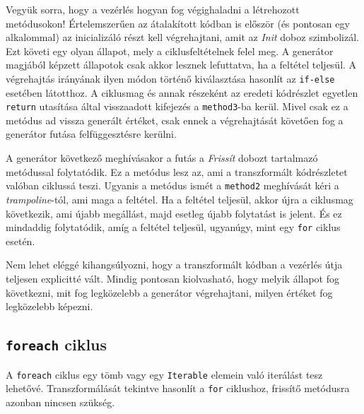 Vegyük sorra, hogy a vezérlés hogyan fog végighaladni a létrehozott metódusokon! Értelemszerűen az átalakított kódban is először (és pontosan egy alkalommal) az inicializáló részt kell végrehajtani, amit az \textit{Init} doboz szimbolizál. Ezt követi egy olyan állapot, mely a ciklusfeltételnek felel meg. A generátor magjából képzett állapotok csak akkor lesznek lefuttatva, ha a feltétel teljesül. A végrehajtás irányának ilyen módon történő kiválasztása hasonlít az \texttt{if-else} esetében látotthoz. A ciklusmag és annak részeként az eredeti kódrészlet egyetlen \texttt{return} utasítása által visszaadott kifejezés a \texttt{method3}-ba kerül. Mivel csak ez a metódus ad vissza generált értéket, csak ennek a végrehajtását követően fog a generátor futása felfüggesztésre kerülni. 

A generátor következő meghívásakor a futás a \textit{Frissít} dobozt tartalmazó metódussal folytatódik. Ez a metódus lesz az, ami a transzformált kódrészletet valóban ciklussá teszi. Ugyanis a metódus ismét a \texttt{method2} meghívását kéri a \textit{trampoline}-tól, ami maga a feltétel. Ha a feltétel teljesül, akkor újra a ciklusmag következik, ami újabb megállást, majd esetleg újabb folytatást is jelent. És ez mindaddig folytatódik, amíg a feltétel teljesül, ugyanúgy, mint egy \texttt{for} ciklus esetén.

Nem lehet eléggé kihangsúlyozni, hogy a transzformált kódban a vezérlés útja teljesen explicitté vált. Mindig pontosan kiolvasható, hogy melyik állapot fog következni, mit fog legközelebb a generátor végrehajtani, milyen értéket fog legközelebb képezni.

\subsection{\texttt{foreach} ciklus}

A \texttt{foreach} ciklus egy tömb vagy egy \texttt{Iterable} elemein való iterálást tesz lehetővé. Transzformálását tekintve hasonlít a \texttt{for} ciklushoz, frissítő metódusra azonban nincsen szükség.

